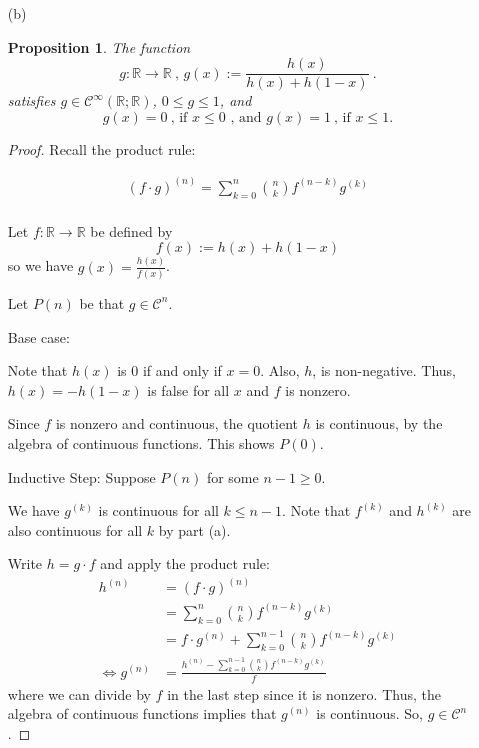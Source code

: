 \documentclass[12pt, reqno]{amsart}
\newtheorem{prop}{Proposition}[section]
\theoremstyle{definition}
\theoremstyle{remark}
\begin{document}
\begin{itemize}
\begin{itemize}
\vspace{0.1 cm}
\item[(b)] 

\begin{prop}
The function
\begin{equation} \label{eq_bump}
g: \mathbb{R} \to \mathbb{R} ~\mbox{, } g(x):= \dfrac{h(x)}{h(x) + h(1 - x)} ~\mbox{.}
\end{equation}
satisfies $g \in \mathcal{C}^\infty(\mathbb{R}; \mathbb{R})$, $0 \leq g \leq 1$, and
\begin{equation}
g(x) = 0 ~\mbox{, if $x \leq 0$ , and } g(x) = 1 ~\mbox{, if $x \leq 1$.} 
\end{equation}
\end{prop}


\begin{proof}

    Recall the product rule:

\begin{align*}
(f\cdot g)^{(n)}=\sum_{k=0}^{n}\binom{n}{k}f^{(n-k)}g^{(k)}\\
\end{align*}


Let $f:\mathbb{R}\rightarrow \mathbb{R}$ be defined by $$f(x):=h(x)+h(1-x)$$so we have $g(x)= \frac{h(x)}{f(x)}$. 

\vspace*{10 pt}
Let $P(n)$ be that $g\in\mathcal{C}^{n}$. 

\vspace*{10 pt}

Base case: 

\vspace*{10 pt}

Note that $h(x)$ is 0 if and only if $x=0$. Also, $h$, is non-negative. Thus, $h(x)=-h(1-x)$ is false for all $x$ and $f$ is nonzero.

\vspace*{10 pt}

Since $f$ is nonzero and continuous, the quotient $h$ is continuous, by the algebra of continuous functions. This shows $P(0)$.

Inductive Step: Suppose $P(n)$ for some $n-1\ge0$. 

We have $g^{(k)}$ is continuous for all $k\le n-1$. Note that $f^{(k)}$ and $h^{(k)}$ are also continuous for all $k$ by part (a). 

\vspace*{10 pt}

Write $h= g\cdot f$ and apply the product rule:
\begin{align*}
h^{(n)}&= (f\cdot g)^{(n)}\\
&= \sum_{k=0}^{n}\binom{n}{k}f^{(n-k)}g^{(k)}\\
&= f\cdot g^{(n)}+\sum_{k=0}^{n-1}\binom{n}{k}f^{(n-k)}g^{(k)}\\
\iff g^{(n)}&= \frac{h^{(n)}-\sum_{k=0}^{n-1}\binom{n}{k}f^{(n-k)}g^{(k)}}{f}
\end{align*}
where we can divide by $f$ in the last step since it is nonzero. Thus, the algebra of continuous functions implies that $g^{(n)}$ is continuous. So, $g\in\mathcal{C}^{n}$.


\end{proof}
\end{itemize}
\end{itemize}
\end{document}
